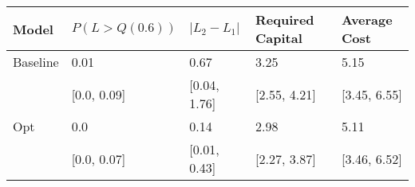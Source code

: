 \begin{tabular}{lllll}
\toprule
   Model & $P(L > Q(0.6))$ & $|L_2 - L_1|$ & Required Capital & Average Cost \\
\midrule
Baseline &            0.01 &          0.67 &             3.25 &         5.15 \\
         &     [0.0, 0.09] &  [0.04, 1.76] &     [2.55, 4.21] & [3.45, 6.55] \\
     Opt &             0.0 &          0.14 &             2.98 &         5.11 \\
         &     [0.0, 0.07] &  [0.01, 0.43] &     [2.27, 3.87] & [3.46, 6.52] \\
\bottomrule
\end{tabular}
